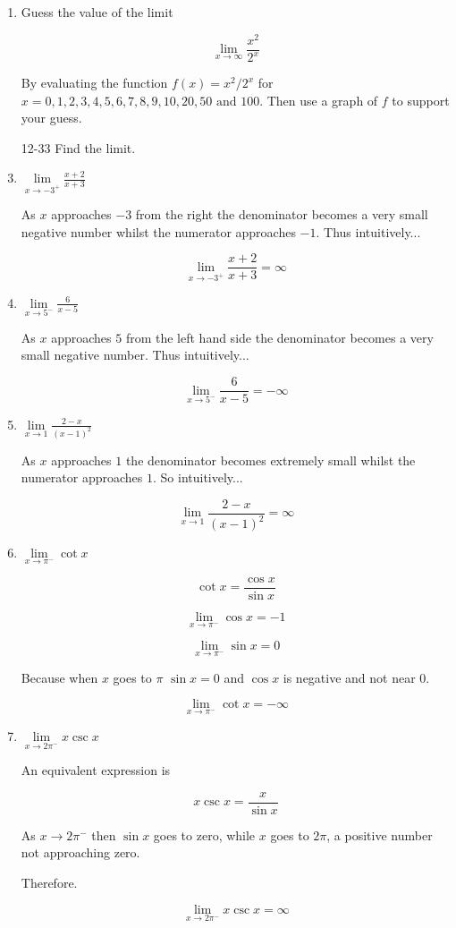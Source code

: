 \documentclass{article}
\begin{document}
\begin{enumerate}
		\item Guess the value of the limit

			$$\lim \limits _{x \to \infty} \frac{x^2}{2^x}$$

		By evaluating the function $f(x) = x^2/2^x$ for $x = 0,1,2,3,4,5,6,7,8,9,10,20,50 \text{ and } 100$.
		Then use a graph of $f$ to support your guess.

		\item[12-33] Find the limit.

		\item $\lim \limits _{x \to -3^{+}} \frac{x+2}{x+3}$

			As $x$ approaches $-3$ from the right the denominator becomes
			a very small negative number whilst the numerator approaches
			$-1$. Thus intuitively...

			$$\lim \limits _{x \to -3^{+}} \frac{x+2}{x+3} = \infty$$

		\item $\lim \limits _{x \to 5^{-}} \frac{6}{x-5}$

			As $x$ approaches $5$ from the left hand side the denominator
			becomes a very small negative number. Thus intuitively...

			$$\lim \limits _{x \to 5^{-}} \frac{6}{x-5} = -\infty$$

		\item $\lim \limits _{x \to 1} \frac{2-x}{(x-1)^2}$

			As $x$ approaches $1$ the denominator becomes extremely
			small whilst the numerator approaches $1$. So intuitively...

			$$\lim \limits _{x \to 1} \frac{2-x}{(x-1)^2} = \infty$$

		\item $\lim \limits _{x \to \pi^{-}} \cot x$

			$$\cot x = \frac{\cos x}{\sin x}$$

			$$\lim \limits _{x \to \pi^{-}} \cos x = -1$$

			$$\lim \limits _{x \to \pi^{-}} \sin x = 0$$

			Because when $x$ goes to $\pi$ $\sin x = 0$ and $\cos x$ is
			negative and not near 0.

			$$\lim \limits _{x \to \pi^{-}} \cot x = -\infty$$

		\item $\lim \limits _{x \to 2\pi^{-}} x \csc x$

			An equivalent expression is

			$$x \csc x = \frac{x}{\sin x}$$

			As $x \to 2\pi^{-}$ then $\sin x$ goes to zero, while
			$x$ goes to $2\pi$, a positive number not approaching zero.

			Therefore.

			$$\lim \limits _{x \to 2\pi^{-}} x \csc x = \infty$$
	\end{enumerate}
\end{document}
